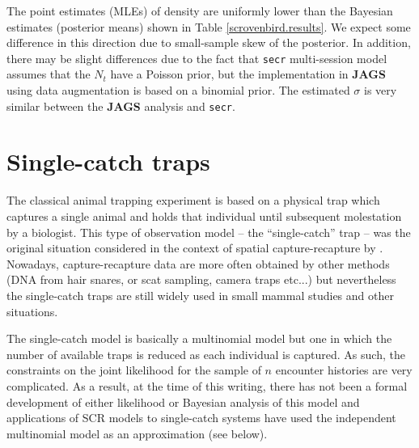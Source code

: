 The point estimates (MLEs) of density are uniformly lower than the
Bayesian estimates (posterior means) shown in Table
\ref{scrovenbird.results}.  We expect some difference in this
direction due to small-sample skew of the posterior.  In addition,
there may be slight differences due to the fact that \mbox{\tt secr}
multi-session model assumes that the $N_{t}$ have a Poisson prior, but
the implementation in {\bf JAGS} using data augmentation is based on a
binomial prior.  The estimated $\sigma$ is very similar between the
{\bf JAGS} analysis and \mbox{\tt secr}.






\section{Single-catch traps}
\label{poisson-mn.sec.singlecatch}

The classical animal trapping experiment is based on a physical trap
which captures a single animal and holds that individual until
subsequent molestation by a biologist.  This type of observation model
-- the ``single-catch'' trap -- was the original situation considered
in the context of spatial capture-recapture by
\citet{efford:2004}. Nowadays, capture-recapture data are more often
obtained by other methods (DNA from hair snares, or scat sampling,
camera traps etc...) but nevertheless the single-catch traps are still
widely used in small mammal studies \citep{converse_etal:2006ea,
  converse_royle:2012} and other situations.

The single-catch model is basically a multinomial model but one in
which the number of available traps is reduced as each individual is
captured. As such, the constraints on the joint likelihood for the
sample of $n$ encounter histories are very complicated.  As a result,
at the time of this writing, there has not been a formal development
of either likelihood or Bayesian analysis of this model and
applications of SCR models to single-catch systems have used the
independent multinomial model as an approximation (see below).

